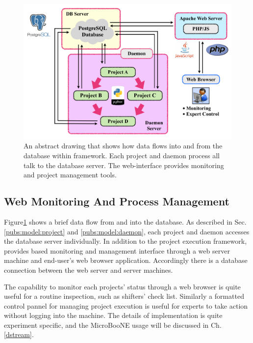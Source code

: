 \begin{figure}\begin{center}
\includegraphics[width=14.5cm]{./img/PUB_Model.pdf}
\caption{ An abstract drawing that shows how data flows into and from the
{\psql} database within {\pubs} framework. Each project and daemon process
all talk to the database server. The {\php} web-interface provides monitoring
and project management tools.}
\label{pubs:model:model}
\end{center}\end{figure}


\subsection{Web Monitoring And Process Management}
\label{pubs:model:monitor}

Figure\ref{pubs:model:model} shows a brief data flow from and into the 
{\psql} database. As described in Sec.\ref{pubs:model:project} and
\ref{pubs:model:daemon}, each project and daemon accesses the database
server individually. In addition to the project execution framework, 
{\pubs} provides {\php} based monitoring and management interface through 
a web server machine and end-user's web browser application. Accordingly
there is a database connection between the web server and {\psql} server
machines.

The capability to monitor each projects' status through a web browser is
quite useful for a routine inspection, such as shifters' check list.
Similarly a formatted control pannel for managing project
execution is useful for experts to take action without logging into the
machine. The details of {\php} implementation is quite experiment specific, 
and the MicroBooNE usage will be discussed in Ch.\ref{dstream}. 
